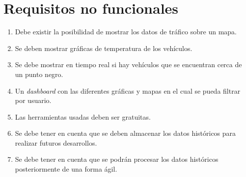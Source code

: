 \section{Requisitos no funcionales\label{RNF}}

\begin{enumerate}
\item Debe existir la posibilidad de mostrar los datos de tráfico sobre un
  mapa.
\item Se deben mostrar gráficas de temperatura de los vehículos.
\item Se debe mostrar en tiempo real si hay vehículos que se encuentran
  cerca de un punto negro.
\item Un {\em dashboard} con las diferentes gráficas y mapas en el cual se
  pueda filtrar por usuario.
\item Las herramientas usadas deben ser gratuitas.
\item Se debe tener en cuenta que se deben almacenar los datos históricos
  para realizar futuros desarrollos.
\item Se debe tener en cuenta que se podrán procesar los datos históricos
  posteriormente de una forma ágil.
\end{enumerate}

